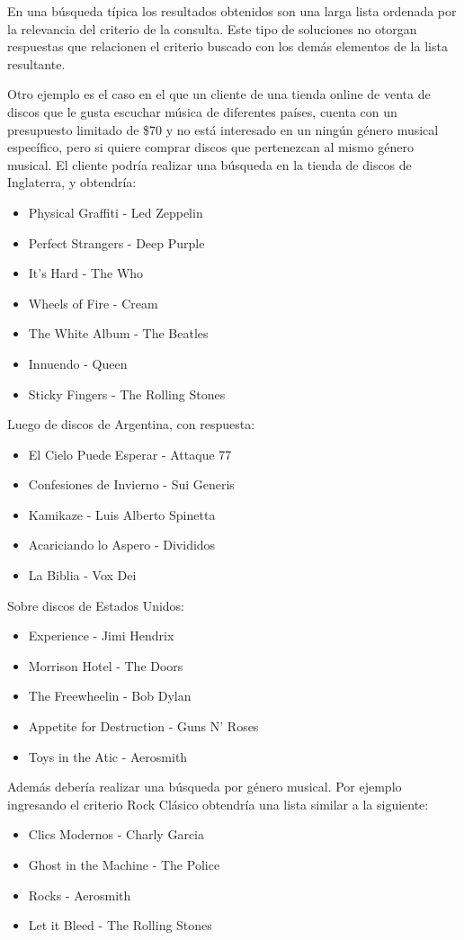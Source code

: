 En una búsqueda típica los resultados obtenidos son una larga lista ordenada por la relevancia del criterio de la consulta. Este tipo de soluciones no otorgan respuestas que relacionen el criterio buscado con los demás elementos de la lista resultante.

Otro ejemplo es el caso en el que un cliente de una tienda online de venta de discos que le gusta escuchar música de diferentes países, cuenta con un presupuesto limitado de \$70 y no está interesado en un ningún género musical específico, pero si quiere comprar discos que pertenezcan al mismo género musical. El cliente podría realizar una búsqueda en la tienda de discos de Inglaterra, y obtendría:
\begin{itemize}
  \item Physical Graffiti - Led Zeppelin
  \item Perfect Strangers - Deep Purple
  \item It's Hard - The Who 
  \item Wheels of Fire - Cream
  \item The White Album - The Beatles
  \item Innuendo - Queen
  \item Sticky Fingers - The Rolling Stones
\end{itemize}
Luego de discos de Argentina, con respuesta:
\begin{itemize}
  \item El Cielo Puede Esperar - Attaque 77
  \item Confesiones de Invierno - Sui Generis
  \item Kamikaze - Luis Alberto Spinetta
  \item Acariciando lo Aspero - Divididos
  \item La Biblia - Vox Dei
\end{itemize} 
Sobre discos de Estados Unidos:
\begin{itemize}	
	\item Experience - Jimi Hendrix
	\item Morrison Hotel - The Doors
	\item The Freewheelin - Bob Dylan
	\item Appetite for Destruction - Guns N' Roses
	\item Toys in the Atic - Aerosmith
\end{itemize}
Además debería realizar una búsqueda por género musical. Por ejemplo ingresando el criterio Rock Clásico obtendría una lista similar a la siguiente:
\begin{itemize}
	\item Clics Modernos - Charly Garcia
	\item Ghost in the Machine - The Police
	\item Rocks - Aerosmith
	\item Let it Bleed - The Rolling Stones
\end{itemize}

